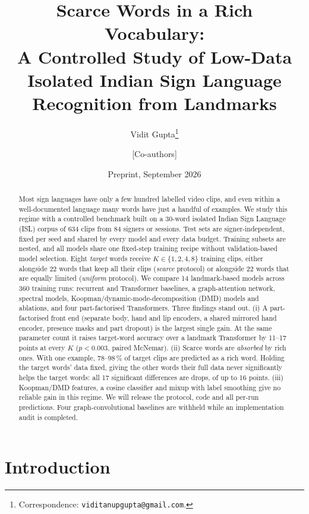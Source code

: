 \documentclass[11pt]{article}
\title{Scarce Words in a Rich Vocabulary:\\
A Controlled Study of Low-Data Isolated {Indian} Sign Language Recognition from Landmarks}
\author{Vidit Gupta\thanks{Correspondence: \texttt{viditanupgupta@gmail.com}.} \and [Co-authors]}
\date{Preprint, September 2026}
\begin{document}
\maketitle

\begin{abstract}
Most sign languages have only a few hundred labelled video clips, and even within a
well-documented language many words have just a handful of examples. We study this regime
with a controlled benchmark built on a 30-word isolated Indian Sign Language (ISL) corpus of
634 clips from 84 signers or sessions. Test sets are signer-independent, fixed per seed and
shared by every model and every data budget. Training subsets are nested, and all models
share one fixed-step training recipe without validation-based model selection. Eight
\emph{target} words receive $K\in\{1,2,4,8\}$ training clips, either alongside 22 words that
keep all their clips (\emph{scarce} protocol) or alongside 22 words that are equally limited
(\emph{uniform} protocol). We compare 14 landmark-based models across 360 training runs:
recurrent and Transformer baselines, a graph-attention network, spectral models,
Koopman/dynamic-mode-decomposition (DMD) models and ablations, and four part-factorised
Transformers. Three findings stand out. (i) A part-factorised front end (separate body, hand
and lip encoders, a shared mirrored hand encoder, presence masks and part dropout) is the
largest single gain. At the same parameter count it raises target-word accuracy over a
landmark Transformer by 11--17 points at every $K$ ($p<0.003$, paired McNemar). (ii) Scarce
words are \emph{absorbed} by rich ones. With one example, 78--98\,\% of target clips are
predicted as a rich word. Holding the target words' data fixed, giving the other words their
full data never significantly helps the target words: all 17 significant differences are
drops, of up to 16 points. (iii) Koopman/DMD features, a cosine classifier and mixup with
label smoothing give no reliable gain in this regime. We will release the protocol, code and all
per-run predictions. Four graph-convolutional baselines are withheld while an implementation
audit is completed.
\end{abstract}

\section{Introduction}
\end{document}
